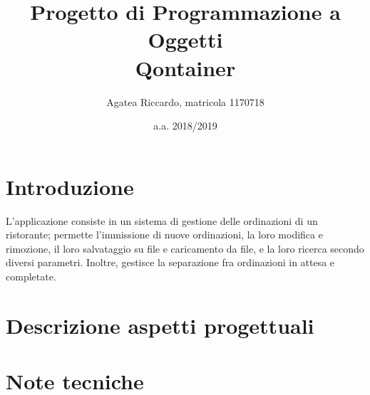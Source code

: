 \documentclass[10pt]{article}
\title{Progetto di Programmazione a Oggetti\\Qontainer}
\author{Agatea Riccardo, matricola 1170718}
\date{a.a. 2018/2019}
\theoremstyle{remark}
\begin{document}
\maketitle
\section{Introduzione} %
\label{sec:introduzione}
L'applicazione consiste in un sistema di gestione delle ordinazioni di un ristorante; permette l'immissione di nuove ordinazioni, la loro modifica e rimozione, il loro salvataggio su file e caricamento da file, e la loro ricerca secondo diversi parametri. Inoltre, gestisce la separazione fra ordinazioni in attesa e completate.
\section{Descrizione aspetti progettuali} %
\label{sec:descrizione_aspetti_progettuali}





\section{Note tecniche} %
\label{sec:note_tecniche}



\end{document}

